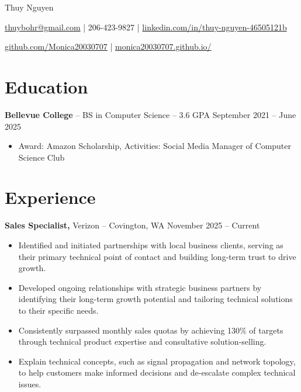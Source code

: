 \documentclass[11pt]{article}       %
\begin{document}
\centerline{\Huge Thuy Nguyen}

\vspace{5pt}

\centerline{\href{mailto:thuybohr@gmail.com}{thuybohr@gmail.com} | 206-423-9827 |
\href{https://www.linkedin.com/in/thuy-nguyen-46505121b/}{linkedin.com/in/thuy-nguyen-46505121b}}

\centerline{\href{https://github.com/Monica20030707}{github.com/Monica20030707} | 
\href{https://monica20030707.github.io/}{monica20030707.github.io/}} 

\vspace{-9pt}

\section*{Education}
\textbf{Bellevue College} -- BS in Computer Science -- 3.6 GPA \hfill September 2021 -- June 2025\\
\vspace{-9pt}
\begin{itemize}
  \item Award: Amazon Scholarship, Activities: Social Media Manager of Computer Science Club
\end{itemize}

\vspace{-18.5pt}

\section*{Experience}

\textbf{Sales Specialist,} {Verizon} -- Covington, WA \hfill November 2025 -- Current \\
\vspace{-9pt}
\begin{itemize}
  \item Identified and initiated partnerships with local business clients, serving as their primary technical point of contact and building long-term trust to drive growth.
  \item Developed ongoing relationships with strategic business partners by identifying their long-term growth potential and tailoring technical solutions to their specific needs.
  \item Consistently surpassed monthly sales quotas by achieving 130\% of targets through technical product expertise and consultative solution-selling.
  \item Explain technical concepts, such as signal propagation and network topology, to help customers make informed decisions and de-escalate complex technical issues.
\end{itemize}
\end{document}
